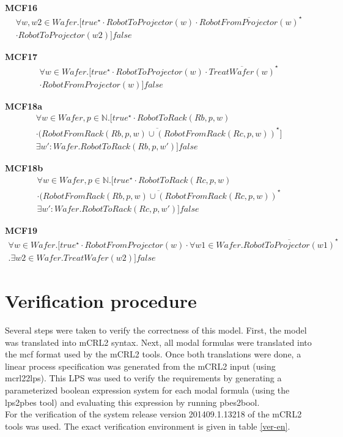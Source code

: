 \documentclass[12pt]{report}
\begin{document}
    \textbf{MCF16}
    \begin{multline*}
        \forall w,w2 \in \mathit{Wafer}. [true^{\star} \cdot RobotToProjector(w) \cdot \overline{RobotFromProjector(w)}^{\star} \\
        \cdot RobotToProjector(w2)]false
    \end{multline*}

    \textbf{MCF17}
    \begin{multline*}
        \forall w \in \mathit{Wafer}. [true^{\star} \cdot RobotToProjector(w) \cdot \overline{Treat\mathit{Wafer}(w)}^{\star} \\
        \cdot RobotFromProjector(w)]false
    \end{multline*}

    \textbf{MCF18a}
    \begin{multline*}
        \forall w \in \mathit{Wafer}, p \in \mathbb{N}. [true^{\star} \cdot RobotToRack(Rb, p, w) \\
        \cdot \overline{(RobotFromRack(Rb,p,w) \cup (RobotFromRack(Rc,p,w))}^{\star}] \\
        \exists w':Wafer. RobotToRack(Rb,p,w')]false
    \end{multline*}

    \textbf{MCF18b}
    \begin{multline*}
        \forall w \in \mathit{Wafer}, p \in \mathbb{N}. [true^{\star} \cdot RobotToRack(Rc, p, w) \\
        \cdot \overline{(RobotFromRack(Rb,p,w) \cup (RobotFromRack(Rc,p,w))}^{\star} \\
        \exists w':Wafer. RobotToRack(Rc,p,w')]false
    \end{multline*}

    \textbf{MCF19}
    \begin{multline*}
        \forall w \in \mathit{\mathit{Wafer}}. [true^{\star} \cdot RobotFromProjector(w) \cdot  \forall w1 \in \mathit{Wafer}. \overline{RobotToProjector(w1)}^{\star} \\
        . \exists w2 \in \mathit{Wafer}. Treat\mathit{Wafer}(w2)]false
    \end{multline*}

	\section{Verification procedure}
	Several steps were taken to verify the correctness of this model. First, the model was translated into mCRL2 syntax. Next, all modal formulas were translated into the mcf format used by the mCRL2 tools. Once both translations were done, a linear process specification was generated from the mCRL2 input (using mcrl22lps). This LPS was used to verify the requirements by generating a parameterized boolean expression system for each modal formula (using the lps2pbes tool) and evaluating this expression by running pbes2bool.\\
	For the verification of the system release version 201409.1.13218 of the mCRL2 tools was used. The exact verification environment is given in table \ref{ver-en}.\\
\end{document}
